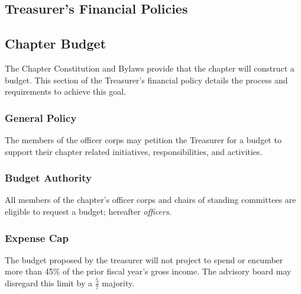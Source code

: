 \documentclass[bylaws,final,10pt,withoutoptional,withoutpreface,officerdoc]{../bylaws}
\begin{document}

\newcommand{\removed}[1]{\cbstart\removedfragile{#1}\cbend{}}
\newcommand{\removedfragile}[1]{{\color{red}{#1}}{}}
\newcommand{\added}[1]{\cbstart\addedfragile{#1}\cbend{}}
\newcommand{\addedfragile}[1]{{\color{green!50!black}{#1}}{}}
\newcommand{\changed}[2]{\added{#1}\removed{#2}}



\frontmatter
\maketitle
%
%
\tableofcontents\newpage
\mainmatter
\begin{optionalpart}
\part{Treasurer's Financial Policies}
\end{optionalpart}



\chapter{Chapter Budget}\label{sec:budget}
 The Chapter Constitution and Bylaws provide that the chapter will construct a budget. This section of the Treasurer's financial policy details the process and requirements to achieve this goal.

\section{General Policy} The members of the officer corps may petition the Treasurer for a budget to support their chapter related initiatives, responsibilities, and activities.

\section{Budget Authority} All members of the chapter's officer corps and chairs of standing committees are eligible to request a budget; hereafter {\it officers}. 

\section{Expense Cap} The budget proposed by the treasurer will not project to spend or encumber  more than 45\% of the prior fiscal year's gross income. The advisory board may disregard this limit by a $\frac{5}{7}$ majority. 
\end{document}
